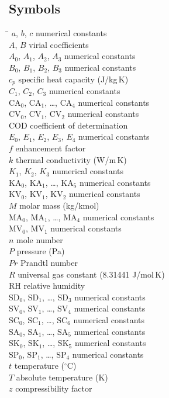 \documentclass[11pt]{article}
\newcommand{\degC}{$^{\circ}$C}
\newcommand{\RH}{\mathrm{RH}}
\begin{document}
\subsection*{Symbols}
\begin{tabbing}
\hspace{3.6cm}\= \kill
$a$, $b$, $c$ \> numerical constants \\
$A$, $B$ \> virial coefficients \\
$A_0$, $A_1$, $A_2$, $A_3$ \> numerical constants \\
$B_0$, $B_1$, $B_2$, $B_3$ \> numerical constants \\
$c_p$ \> specific heat capacity (J/kg\,K) \\
$C_1$, $C_2$, $C_3$ \> numerical constants \\
$\mathrm{CA}_0$, $\mathrm{CA}_1$, \ldots, $\mathrm{CA}_4$ \> numerical constants \\
$\mathrm{CV}_0$, $\mathrm{CV}_1$, $\mathrm{CV}_2$ \> numerical constants \\
COD \> coefficient of determination \\
$E_0$, $E_1$, $E_2$, $E_3$, $E_4$ \> numerical constants \\
$f$ \> enhancement factor \\
$k$ \> thermal conductivity (W/m\,K) \\
$K_1$, $K_2$, $K_3$ \> numerical constants \\
$\mathrm{KA}_0$, $\mathrm{KA}_1$, \ldots, $\mathrm{KA}_5$ \> numerical constants \\
$\mathrm{KV}_0$, $\mathrm{KV}_1$, $\mathrm{KV}_2$ \> numerical constants \\
$M$ \> molar mass (kg/kmol) \\
$\mathrm{MA}_0$, $\mathrm{MA}_1$, \ldots, $\mathrm{MA}_4$ \> numerical constants \\
$\mathrm{MV}_0$, $\mathrm{MV}_1$ \> numerical constants \\
$n$ \> mole number \\
$P$ \> pressure (Pa) \\
$Pr$ \> Prandtl number \\
$R$ \> universal gas constant (8.31441 J/mol\,K) \\
$\RH$ \> relative humidity \\
$\mathrm{SD}_0$, $\mathrm{SD}_1$, \ldots, $\mathrm{SD}_3$ \> numerical constants \\
$\mathrm{SV}_0$, $\mathrm{SV}_1$, \ldots, $\mathrm{SV}_4$ \> numerical constants \\
$\mathrm{SC}_0$, $\mathrm{SC}_1$, \ldots, $\mathrm{SC}_6$ \> numerical constants \\
$\mathrm{SA}_0$, $\mathrm{SA}_1$, \ldots, $\mathrm{SA}_5$ \> numerical constants \\
$\mathrm{SK}_0$, $\mathrm{SK}_1$, \ldots, $\mathrm{SK}_5$ \> numerical constants \\
$\mathrm{SP}_0$, $\mathrm{SP}_1$, \ldots, $\mathrm{SP}_4$ \> numerical constants \\
$t$ \> temperature (\degC) \\
$T$ \> absolute temperature (K) \\
$z$ \> compressibility factor
\end{tabbing}
\end{document}
